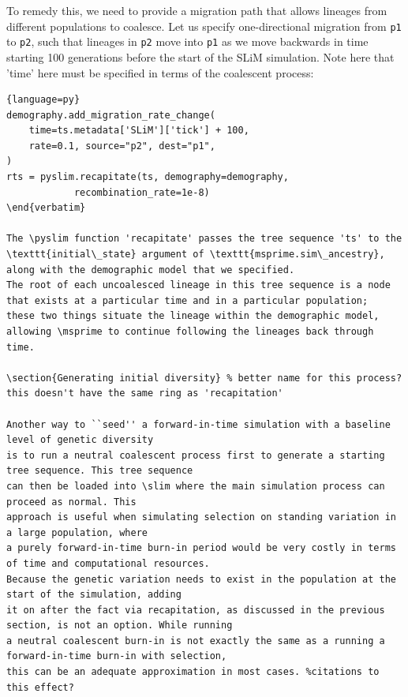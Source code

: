 \documentclass[12pt]{article}
\newcommand{\msprime}[0]{\texttt{msprime}\xspace}
\newcommand{\slim}[0]{\texttt{SLiM}\xspace}
\newcommand{\pyslim}[0]{\texttt{pyslim}\xspace}
\newcommand{\p}[1]{\texttt{p#1}}
\begin{document}
To remedy this, we need to provide a migration path that allows lineages from different populations to coalesce.
Let us specify one-directional migration from \p1 to \p2, such that lineages in \p2 move into \p1 as we move backwards in time
starting 100 generations before the start of the SLiM simulation. Note here that 'time' here must be specified in terms of the coalescent process:
\begin{lstlisting}{language=py}
demography.add_migration_rate_change(
    time=ts.metadata['SLiM']['tick'] + 100,
    rate=0.1, source="p2", dest="p1",
)
rts = pyslim.recapitate(ts, demography=demography,
            recombination_rate=1e-8)
\end{verbatim}

The \pyslim function 'recapitate' passes the tree sequence 'ts' to the
\texttt{initial\_state} argument of \texttt{msprime.sim\_ancestry},
along with the demographic model that we specified.
The root of each uncoalesced lineage in this tree sequence is a node
that exists at a particular time and in a particular population;
these two things situate the lineage within the demographic model,
allowing \msprime to continue following the lineages back through time.

\section{Generating initial diversity} % better name for this process? this doesn't have the same ring as 'recapitation'

Another way to ``seed'' a forward-in-time simulation with a baseline level of genetic diversity
is to run a neutral coalescent process first to generate a starting tree sequence. This tree sequence
can then be loaded into \slim where the main simulation process can proceed as normal. This
approach is useful when simulating selection on standing variation in a large population, where
a purely forward-in-time burn-in period would be very costly in terms of time and computational resources.
Because the genetic variation needs to exist in the population at the start of the simulation, adding
it on after the fact via recapitation, as discussed in the previous section, is not an option. While running
a neutral coalescent burn-in is not exactly the same as a running a forward-in-time burn-in with selection,
this can be an adequate approximation in most cases. %citations to this effect?


\end{lstlisting}
\end{document}
